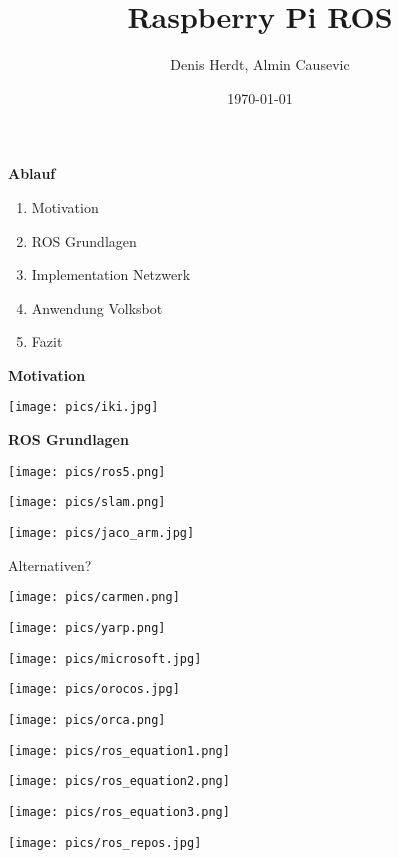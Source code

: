 \documentclass{beamer}
\title[Raspberry Pi ROS \hspace{3cm} Denis Herdt, Almin Causevic]{Raspberry Pi ROS}
\author{Denis Herdt, Almin Causevic}
\institute[I_HS Wgt-Rav]{Angewandte Informatik HS Weingarten-Ravensburg}
\date{\today}
\begin{document}
\frame{\titlepage}

\begin{frame}
{\bf Ablauf}
\begin{enumerate}
\item Motivation
\item ROS Grundlagen
\item Implementation Netzwerk
\item Anwendung Volksbot
\item Fazit
\end{enumerate}
\end{frame}

\begin{frame}
{\bf Motivation}
\centerline{\texttt{[image: pics/iki.jpg]}}\cite{iki}
\end{frame}

\begin{frame}
{\bf ROS Grundlagen}
\centerline{\texttt{[image: pics/ros5.png]}}\cite{ros5}
\end{frame}

\begin{frame}
\centerline{\texttt{[image: pics/slam.png]}}\cite{slam}
\end{frame}

\begin{frame}
\centerline{\texttt{[image: pics/jaco\_arm.jpg]}}\cite{arm}
\end{frame}

\begin{frame}
\huge Alternativen? \\
\parbox{4cm}{\texttt{[image: pics/carmen.png]}}\cite{carmen}
\parbox{4cm}{\texttt{[image: pics/yarp.png]}}\cite{yarp}
\parbox{4cm}{\texttt{[image: pics/microsoft.jpg]}}\cite{microsoft}
\hspace{4cm}
\parbox{4cm}{\texttt{[image: pics/orocos.jpg]}}\cite{orocos}
\parbox{4cm}{\texttt{[image: pics/orca.png]}}\cite{orca}
\end{frame}

\begin{frame}
\centerline{\texttt{[image: pics/ros\_equation1.png]}}
\centerline{\texttt{[image: pics/ros\_equation2.png]}}
\centerline{\texttt{[image: pics/ros\_equation3.png]}}\cite{equation}
\end{frame}

\begin{frame}
\centerline{\texttt{[image: pics/ros\_repos.jpg]}}\cite{repos}
\end{frame}
\end{document}
